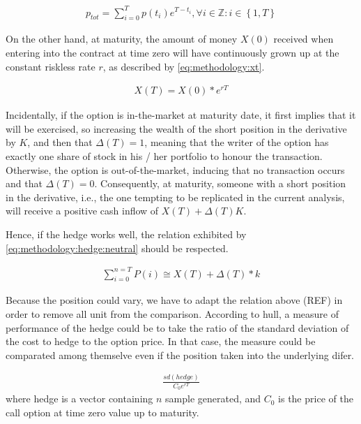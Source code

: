 \documentclass[12pt]{report}
\begin{document}
\begin{align}
  p_{tot} = \sum_{i = 0}^T p(t_i) e^{T-t_i} ,
  \forall i \in \mathbb{Z} : i \in \left \{1, T \right \}
  \label{methodology:porfolio:cost:tot}
\end{align}

On the other hand, at maturity, the amount of money $X(0)$ received when entering into the contract at time zero will have continuously grown up at the constant riskless rate $r$, as described by \cref{eq:methodology:xt}.

\begin{align}
  X(T) = X(0) * e^{rT} \label{eq:methodology:xt}
\end{align}

Incidentally, if the option is in-the-market at  maturity date, it first implies that it will be exercised, so increasing the wealth of the short position in the derivative by $K$, and then that $\Delta(T) = 1$, meaning that the writer of the option has exactly one share of stock in his / her portfolio to honour the transaction.
Otherwise, the option is out-of-the-market, inducing that no transaction occurs and that $\Delta(T) = 0$.
Consequently, at maturity, someone with a short position in the derivative, i.e., the one tempting to be replicated in the current analysis, will receive a positive cash inflow of $X(T) + \Delta(T) K$.

Hence, if the hedge works well, the relation exhibited by \ref{eq:methodology:hedge:neutral} should be respected.

\begin{align}
 \sum_{i = 0}^{n = T} P(i) \cong X(T) + \Delta(T) * k \label{eq:methodology:hedge:neutral}
\end{align}

Because the position could vary, we have to adapt the relation above (REF) in order to remove all unit from the comparison.
According to hull, a measure of performance of the hedge could be to take the ratio of the standard deviation of the cost to hedge to the option price. In that case, the measure could be comparated among themselve even if the position taken into the underlying difer.

\begin{align}
  \frac{sd(hedge)}{C_0 e ^{r T}}
  \label{bsm:delta:hedge:perf}
\end{align}
where hedge is a vector containing $n$ sample generated, and $C_0$ is the price of the call option at time zero value up to maturity.
\end{document}
